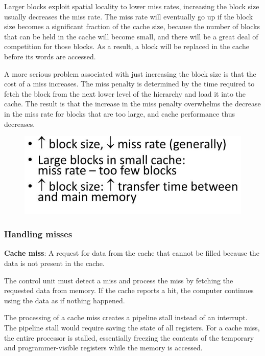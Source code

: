 \documentclass[10pt,a4paper]{article}
\begin{document}
Larger blocks exploit spatial locality to lower miss rates, increasing the block size usually
decreases the miss rate. The miss rate will eventually go up if the block size becomes a significant
fraction of the cache size, because the number of blocks that can be held in the cache will become
small, and there will be a great deal of competition for those blocks. As a result, a block will be
replaced in the cache before its words are accessed. 

A more serious problem associated with just increasing the block size is that the cost of a miss
increases. The miss penalty is determined by the time required to fetch the block from the next
lower level of the hierarchy and load it into the cache. The result is that the increase in the
miss penalty overwhelms the decrease in the miss rate for blocks that are too large, and cache performance 
thus decreases.
\begin{figure} [h!]
    \centering
    \includegraphics[scale=0.4]{Big.JPG}
\end{figure}

\pagebreak

\subsubsection{Handling misses}

\begin{tcolorbox}[breakable,colback=white]
\textbf{Cache miss}: A request for data from the cache that cannot be filled because the data is not
present in the cache.
\end{tcolorbox}

The control unit must detect a miss and process the miss by fetching the requested data from 
memory. If the cache reports a hit, the computer continues using the data as if nothing happened.

The processing of a cache miss creates a pipeline stall instead of an interrupt. The pipeline stall
would require saving the state of all registers. For a cache miss, the entire processor is stalled,
essentially freezing the contents of the temporary and programmer-visible registers while the memory
is accessed.
\end{document}
